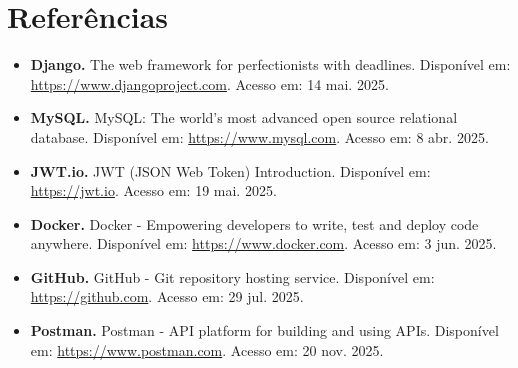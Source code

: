\documentclass[12pt]{article}
\begin{document}
\newpage

\section{Referências}
\begin{itemize}
\item \textbf{Django.} The web framework for perfectionists with deadlines. Disponível em: \url{https://www.djangoproject.com}. Acesso em: 14 mai. 2025.
\item \textbf{MySQL.} MySQL: The world's most advanced open source relational database. Disponível em: \url{https://www.mysql.com}. Acesso em: 8 abr. 2025.
\item \textbf{JWT.io.} JWT (JSON Web Token) Introduction. Disponível em: \url{https://jwt.io}. Acesso em: 19 mai. 2025.
\item \textbf{Docker.} Docker - Empowering developers to write, test and deploy code anywhere. Disponível em: \url{https://www.docker.com}. Acesso em: 3 jun. 2025.
\item \textbf{GitHub.} GitHub - Git repository hosting service. Disponível em: \url{https://github.com}. Acesso em: 29 jul. 2025.
\item \textbf{Postman.} Postman - API platform for building and using APIs. Disponível em: \url{https://www.postman.com}. Acesso em: 20 nov. 2025.
\end{itemize}
\end{document}
